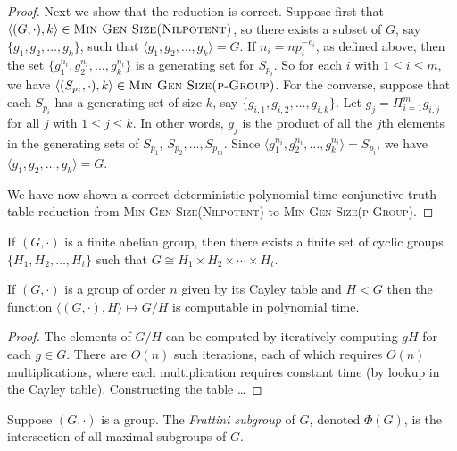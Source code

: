 \documentclass{article}
\newcommand{\gen}[1]{{\langle #1 \rangle}}
\begin{document}
\begin{proof}
  Next we show that the reduction is correct.
  Suppose first that $\langle (G, \cdot), k \rangle \in \textsc{Min Gen Size(Nilpotent)}$, so there exists a subset of $G$, say $\{g_1, g_2, \dotsc, g_k\}$, such that $\gen{g_1, g_2, \dotsc, g_k} = G$.
  If $n_i = n p_i^{-e_i}$, as defined above, then the set $\{g_1^{n_i}, g_2^{n_i}, \dotsc, g_k^{n_i} \}$ is a generating set for $S_{p_i}$.
  So for each $i$ with $1 \leq i \leq m$, we have $\langle (S_{p_i}, \cdot), k \rangle \in \textsc{Min Gen Size(p-Group)}$.
  For the converse, suppose that each $S_{p_i}$ has a generating set of size $k$, say $\{g_{i, 1}, g_{i, 2}, \dotsc, g_{i, k}\}$.
  Let $g_j = \Pi_{i = 1}^m g_{i, j}$ for all $j$ with $1 \leq j \leq k$.
  In other words, $g_j$ is the product of all the $j$th elements in the generating sets of $S_{p_1}$, $S_{p_2}, \dotsc, S_{p_m}$.
  Since $\gen{g_1^{n_i}, g_2^{n_i}, \dotsc, g_k^{n_i}} = S_{p_i} $, we have $\gen{g_1, g_2, \dotsc, g_k} = G$.

  We have now shown a correct deterministic polynomial time conjunctive truth table reduction from \textsc{Min Gen Size(Nilpotent)} to \textsc{Min Gen Size(p-Group)}.
\end{proof}

\begin{lemma}\label{lem:decompose}
  If $(G, \cdot)$ is a finite abelian group, then there exists a finite set of cyclic groups $\{H_1, H_2, \dotsc, H_t\}$ such that $G \cong H_1 \times H_2 \times \dotsb \times H_t$.
\end{lemma}

\begin{lemma}\label{lem:factorgroup}
  If $(G, \cdot)$ is a group of order $n$ given by its Cayley table and $H < G$ then the function $\langle (G, \cdot), H \rangle \mapsto G / H$ is computable in polynomial time.
\end{lemma}
\begin{proof}
  The elements of $G / H$ can be computed by iteratively computing $g H$ for each $g \in G$.
  There are $O(n)$ such iterations, each of which requires $O(n)$ multiplications, where each multiplication requires constant time (by lookup in the Cayley table).
  Constructing the table \ldots
\end{proof}

\begin{definition}
  Suppose $(G, \cdot)$ is a group.
  The \emph{Frattini subgroup} of $G$, denoted $\Phi(G)$, is the intersection of all maximal subgroups of $G$.
\end{definition}
\end{document}
